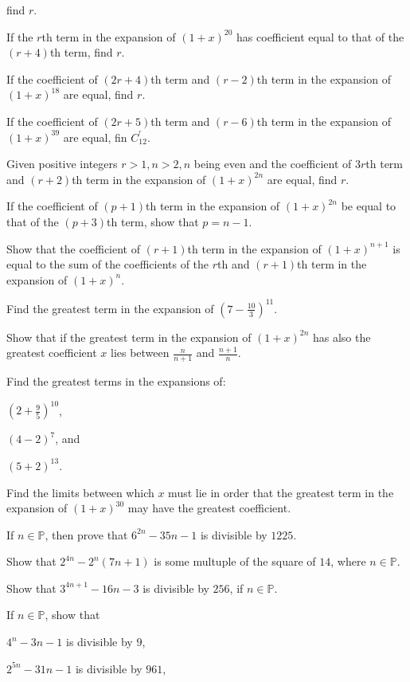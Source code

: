   find $r$.
\item If the $r$th term in the expansion of $(1 + x)^{20}$ has coefficient equal to that of the $(r + 4)$th term, find $r$.
\item If the coefficient of $(2r + 4)$th term and $(r - 2)$th term in the expansion of $(1 + x)^{18}$ are equal, find $r$.
\item If the coefficient of $(2r + 5)$th term and $(r - 6)$th term in the expansion of $(1 + x)^{39}$ are equal, fin $C_{12}^^r$.
\item Given positive integers $r>1, n>2, n$ being even and the coefficient of $3r$th term and $(r + 2)$th term in the expansion of
  $(1 + x)^{2n}$ are equal, find $r$.
\item If the coefficient of $(p + 1)$th term in the expansion of $(1 + x)^{2n}$ be equal to that of the $(p + 3)$th term, show that
  $p = n - 1$.
\item Show that the coefficient of $(r + 1)$th term in the expansion of $(1 + x)^{n + 1}$ is equal to the sum of the coefficients
  of the $r$th and $(r + 1)$th term in the expansion of $(1 + x)^n$.
\item Find the greatest term in the expansion of $\left(7 - \frac{10}{3}\right)^{11}$.
\item Show that if the greatest term in the expansion of $(1 + x)^{2n}$ has also the greatest coefficient $x$ lies between
  $\frac{n}{n + 1}$ and $\frac{n + 1}{n}$.
\item Find the greatest terms in the expansions of:
  \startitemize[i]
  \item $\left(2 + \frac{9}{5}\right)^{10}$,
  \item $(4 - 2)^7$, and
  \item $(5 + 2)^{13}$.
  \stopitemize
\item Find the limits between which $x$ must lie in order that the greatest term in the expansion of $(1 + x)^{30}$ may have the
  greatest coefficient.
\item If $n\in\mathbb{P}$, then prove that $6^{2n} - 35n - 1$ is divisible by $1225$.
\item Show that $2^{4n} - 2^n(7n + 1)$ is some multuple of the square of $14$, where $n\in\mathbb{P}$.
\item Show that $3^{4n + 1} - 16n - 3$ is divisible by $256$, if $n\in\mathbb{P}$.
\item If $n\in\mathbb{P}$, show that
  \startitemize[i]
  \item $4^n - 3n - 1$ is divisible by $9$,
  \item $2^{5n} - 31n - 1$ is divisible by $961$,
